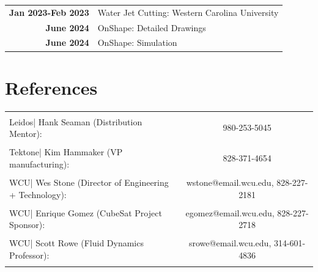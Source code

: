 \documentclass[allblack]{simplehipstercv}
\begin{document}
\begin{paracol}{2}
\begin{tabular}{>{\footnotesize\bfseries}r p{}}
    Jan 2023-Feb 2023 & Water Jet Cutting: Western Carolina University \\

    June 2024 & OnShape: Detailed Drawings \\

    June 2024 & OnShape: Simulation \\
\end{tabular}

\section*{References}
\begin{tabular}{l c}
    \hline & \\[0.5mm]
    Leidos| Hank Seaman (Distribution Mentor): & 980-253-5045\\[8pt]
    \hline & \\[0.5mm]
    Tektone| Kim Hammaker (VP manufacturing): & 828-371-4654\\[8pt]
    \hline & \\[0.5mm]
    WCU| Wes Stone (Director of Engineering + Technology): & wstone@email.wcu.edu, 828-227-2181\\[8pt]
    \hline & \\[0.5mm]
    WCU| Enrique Gomez (CubeSat Project Sponsor): & egomez@email.wcu.edu, 828-227-2718\\[8pt]
    \hline & \\[0.5mm]
    WCU| Scott Rowe (Fluid Dynamics Professor): & srowe@email.wcu.edu, 314-601-4836\\[8pt]
    \hline & \\[0.5mm]
\end{tabular}

\bigskip
\newpage

\end{paracol}
\end{document}
